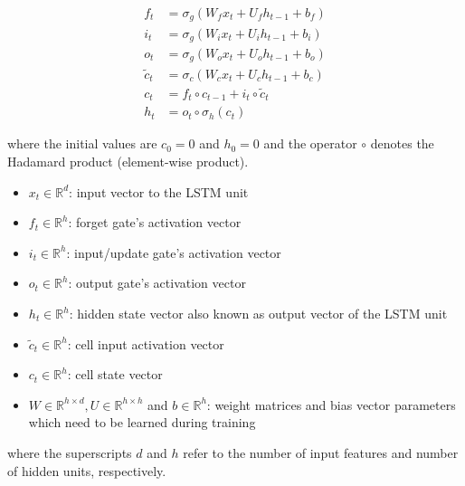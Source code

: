 \documentclass[12pt]{report}
\begin{document}


\begin{align*}
	f_t &= \sigma_g(W_{f} x_t + U_{f} h_{t-1} + b_f) \\
	i_t &= \sigma_g(W_{i} x_t + U_{i} h_{t-1} + b_i) \\
	o_t &= \sigma_g(W_{o} x_t + U_{o} h_{t-1} + b_o) \\
	\tilde{c}_t &= \sigma_c(W_{c} x_t + U_{c} h_{t-1} + b_c) \\
	c_t &= f_t \circ c_{t-1} + i_t \circ \tilde{c}_t \\
	h_t &= o_t \circ \sigma_h(c_t)
\end{align*}

where the initial values are $c_0 = 0$ and $h_0 = 0$ and the operator $\circ$ denotes the Hadamard product (element-wise product). 

\begin{itemize}
	\item $x_t \in \mathbb{R}^{d}$: input vector to the LSTM unit 
	\item $f_t \in \mathbb{R}^{h}$: forget gate's activation vector
	\item $i_t \in \mathbb{R}^{h}$: input/update gate's activation vector 
	\item $o_t \in \mathbb{R}^{h}$: output gate's activation vector
	\item $h_t \in \mathbb{R}^{h}$: hidden state vector also known as output vector of the LSTM unit 
	\item $\tilde{c}_t \in \mathbb{R}^{h}$: cell input activation vector
	\item $c_t \in \mathbb{R}^{h}$: cell state vector
	\item $W \in \mathbb{R}^{h \times d}, U \in \mathbb{R}^{h \times h} $ and $b \in \mathbb{R}^{h}$: weight matrices and bias vector parameters which need to be learned during training
\end{itemize}

where the superscripts $d$ and $h$ refer to the number of input features and number of hidden units, respectively.
\end{document}
